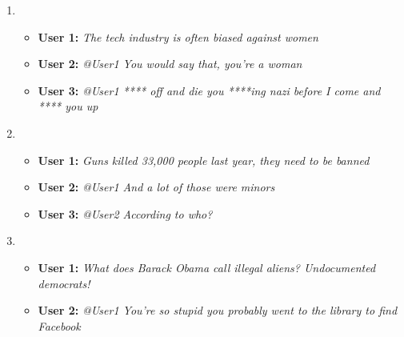 \begin{enumerate}
\item 
\begin{itemize}
\item \textbf{User 1:} \textit{The tech industry is often biased against women}
\item \textbf{User 2:} \textit{@User1 You would say that, you're a woman}
\item \textbf{User 3:} \textit{@User1 **** off and die you ****ing nazi before I come and **** you up}
\end{itemize}

\item
\begin{itemize}
\item \textbf{User 1:} \textit{Guns killed 33,000 people last year, they need to be banned}
\item \textbf{User 2:} \textit{@User1 And a lot of those were minors}
\item \textbf{User 3:} \textit{@User2 According to who?}
\end{itemize}

\item
\begin{itemize}
\item \textbf{User 1:} \textit{What does Barack Obama call illegal aliens? Undocumented democrats!}
\item \textbf{User 2:} \textit{@User1 You're so stupid you probably went to the library to find Facebook}
\end{itemize}

\end{enumerate}

